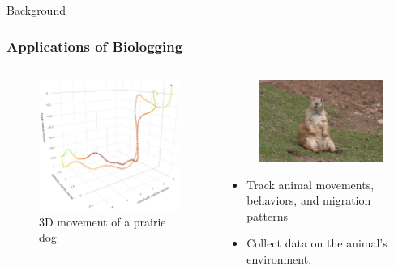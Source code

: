 \documentclass{beamer}
\begin{document}
\begin{frame}{Background}
  \frametitle{Applications of Biologging}
  \begin{columns}
    \begin{column}{0.5\textwidth}
  \begin{figure}[htbp]
    \centering
    \includegraphics[width=\textwidth]{prairie_dog_map.jpg}
    \caption{3D movement of a prairie dog \cite{Kidangoor_2024}}
    \label{fig:prairie_dog_3D_movement}
  \end{figure}
\end{column}
\begin{column}{0.5\textwidth}
  \begin{figure}[htbp]
    \centering
    \includegraphics[width=.5\textwidth]{prairie_dog.jpg}
    \label{fig:prairie_dog}
  \end{figure}
  \begin{itemize}
    \item Track animal movements, behaviors, and migration patterns
    \item Collect data on the animal's environment.
  \end{itemize}
\end{column}
\end{columns}
\end{frame}
\end{document}
